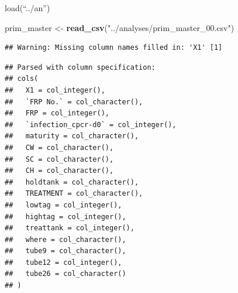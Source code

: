 \documentclass[]{article}
\newenvironment{Shaded}{\begin{snugshade}}{\end{snugshade}}
\newcommand{\KeywordTok}[1]{\textcolor[rgb]{0.13,0.29,0.53}{\textbf{#1}}}
\newcommand{\StringTok}[1]{\textcolor[rgb]{0.31,0.60,0.02}{#1}}
\newcommand{\NormalTok}[1]{#1}
\begin{document}
load(``../an'')

\begin{Shaded}
\begin{Highlighting}[]
\NormalTok{prim_master <-}\StringTok{ }\KeywordTok{read_csv}\NormalTok{(}\StringTok{"../analyses/prim_master_00.csv"}\NormalTok{)}
\end{Highlighting}
\end{Shaded}

\begin{verbatim}
## Warning: Missing column names filled in: 'X1' [1]
\end{verbatim}

\begin{verbatim}
## Parsed with column specification:
## cols(
##   X1 = col_integer(),
##   `FRP No.` = col_character(),
##   FRP = col_integer(),
##   `infection_cpcr-d0` = col_integer(),
##   maturity = col_character(),
##   CW = col_character(),
##   SC = col_character(),
##   CH = col_character(),
##   holdtank = col_character(),
##   TREATMENT = col_character(),
##   lowtag = col_integer(),
##   hightag = col_integer(),
##   treattank = col_integer(),
##   where = col_character(),
##   tube9 = col_character(),
##   tube12 = col_integer(),
##   tube26 = col_character()
## )
\end{verbatim}
\end{document}
